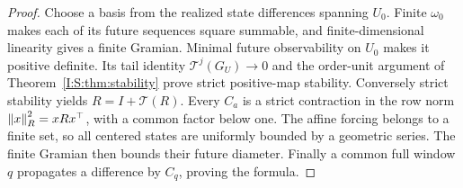 \begin{proof}
Choose a basis from the realized state differences spanning $U_0$. Finite $\omega_0$ makes each of its future sequences square summable, and finite-dimensional linearity gives a finite Gramian. Minimal future observability on $U_0$ makes it positive definite. Its tail identity $\mathcal T^j(G_U)\to0$ and the order-unit argument of Theorem~\ref{I:S:thm:stability} prove strict positive-map stability. Conversely strict stability yields $R=I+\mathcal T(R)$. Every $C_a$ is a strict contraction in the row norm $\left\lVert x\right\rVert_R^2=xRx^\top$, with a common factor below one. The affine forcing belongs to a finite set, so all centered states are uniformly bounded by a geometric series. The finite Gramian then bounds their future diameter. Finally a common full window $q$ propagates a difference by $C_q$, proving the formula.
\end{proof}
